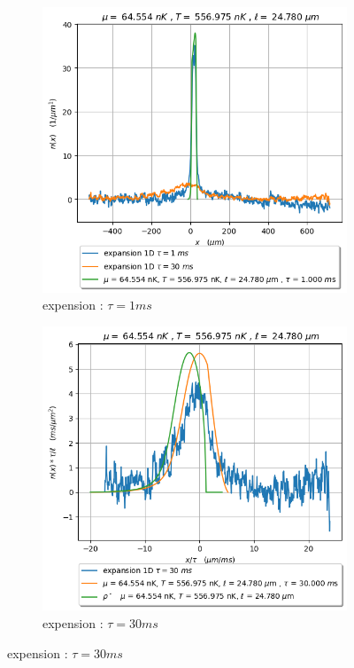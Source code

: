 \documentclass[a3, 10pt,twoside]{article}          %
\theoremstyle{plain}
\theoremstyle{definition}
\theoremstyle{remark}
\theoremstyle{definition} %
\begin{document}
\begin{figure}[ht]
    \centering
    \begin{subfigure}[b]{0.45\textwidth}
        \centering
        \includegraphics[width=\textwidth]{Figures/simul_expansion_1_24-04-2024}
        \caption{expension : $\tau = 1ms$}
        \label{fig:sub1}
    \end{subfigure}
    \hfill
     \begin{subfigure}[b]{0.45\textwidth}
        \centering
        \includegraphics[width=\textwidth]{Figures/simul_expansion_30_24-04-2024}
        \caption{expension : $\tau = 30ms$}
        \label{fig:sub1}
    \end{subfigure}
    

\end{figure}
\end{document}
